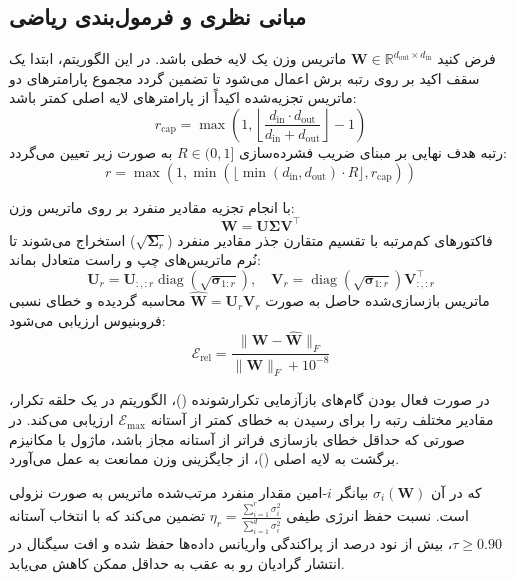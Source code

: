 \subsection{مبانی نظری و فرمول‌بندی ریاضی}
فرض کنید $\mathbf{W} \in \mathbb{R}^{d_{\text{out}} \times d_{\text{in}}}$ ماتریس وزن یک لایه خطی باشد. در این الگوریتم، ابتدا یک سقف اکید بر روی رتبه برش اعمال می‌شود تا تضمین گردد مجموع پارامترهای دو ماتریس تجزیه‌شده اکیداً از پارامترهای لایه اصلی کمتر باشد:
\begin{equation}
r_{\text{cap}} = \max \left( 1, \left\lfloor \frac{d_{\text{in}} \cdot d_{\text{out}}}{d_{\text{in}} + d_{\text{out}}} \right\rfloor - 1 \right)
\end{equation}
رتبه هدف نهایی بر مبنای ضریب فشرده‌سازی $R \in (0, 1]$ به صورت زیر تعیین می‌گردد:
\begin{equation}
r = \max \left( 1, \min \left( \lfloor \min(d_{\text{in}}, d_{\text{out}}) \cdot R \rfloor, r_{\text{cap}} \right) \right)
\end{equation}

با انجام تجزیه مقادیر منفرد بر روی ماتریس وزن:
\begin{equation}
\mathbf{W} = \mathbf{U} \mathbf{\Sigma} \mathbf{V}^\top
\end{equation}
فاکتورهای کم‌مرتبه با تقسیم متقارن جذر مقادیر منفرد ($\sqrt{\mathbf{\Sigma}_r}$) استخراج می‌شوند تا نُرم ماتریس‌های چپ و راست متعادل بماند:
\begin{equation}
\mathbf{U}_r = \mathbf{U}_{:, :r} \operatorname{diag}(\sqrt{\mathbf{\sigma}_{1:r}}), \quad \mathbf{V}_r = \operatorname{diag}(\sqrt{\mathbf{\sigma}_{1:r}}) \mathbf{V}_{:, :r}^\top
\end{equation}
ماتریس بازسازی‌شده حاصل به صورت $\hat{\mathbf{W}} = \mathbf{U}_r \mathbf{V}_r$ محاسبه گردیده و خطای نسبی فروبنیوس ارزیابی می‌شود:
\begin{equation}
\mathcal{E}_{\text{rel}} = \frac{\|\mathbf{W} - \hat{\mathbf{W}}\|_F}{\|\mathbf{W}\|_F + 10^{-8}}
\end{equation}

در صورت فعال بودن گام‌های بازآزمایی تکرارشونده ()، الگوریتم در یک حلقه تکرار، مقادیر مختلف رتبه را برای رسیدن به خطای کمتر از آستانه $\mathcal{E}_{\text{max}}$ ارزیابی می‌کند. در صورتی که حداقل خطای بازسازی فراتر از آستانه مجاز باشد، ماژول با مکانیزم برگشت به لایه اصلی ()، از جایگزینی وزن ممانعت به عمل می‌آورد.

که در آن $\sigma_i(\mathbf{W})$ بیانگر $i$-امین مقدار منفرد مرتب‌شده ماتریس به صورت نزولی است. نسبت حفظ انرژی طیفی $\eta_r = \frac{\sum_{i=1}^r \sigma_i^2}{\sum_{i=1}^{d} \sigma_i^2}$ تضمین می‌کند که با انتخاب آستانه $\tau \ge 0.90$، بیش از نود درصد از پراکندگی واریانس داده‌ها حفظ شده و افت سیگنال در انتشار گرادیان رو به عقب به حداقل ممکن کاهش می‌یابد.

